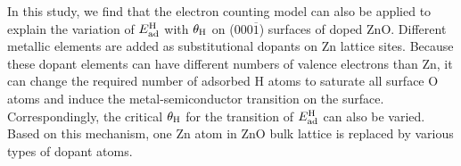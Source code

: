 In this study, we find that the electron counting model can also be applied to explain the variation of $E_{\textup{ad}}^{\textup{H}}$ with $\theta_{\textup{H}}$ on (000$\overline{1}$) surfaces of doped ZnO\cite{pashley1989electron}. Different metallic elements are added as substitutional dopants on Zn lattice sites. Because these dopant elements can have different numbers of valence electrons than Zn, it can change the required number of adsorbed H atoms to saturate all surface O atoms and induce the metal-semiconductor transition on the surface. Correspondingly, the critical $\theta_{\textup{H}}$ for the transition of $E_{\textup{ad}}^{\textup{H}}$ can also be varied.  Based on this mechanism, one Zn atom in ZnO bulk lattice is replaced by various types of dopant atoms. 

\begingroup
\begin{figure}[!ht]
  \centering
  \label{Chap:ZnO_H:fig:dop1}
  \label{Chap:ZnO_H:fig:dop2}
  \\
  \label{Chap:ZnO_H:fig:dop3}
  \label{Chap:ZnO_H:fig:dop4}

\end{figure}
